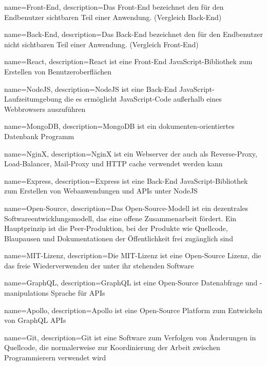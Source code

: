{   name={Front-End},
    description={Das Front-End bezeichnet den für den Endbenutzer sichtbaren Teil einer Anwendung. (Vergleich Back-End)}
}

{   name={Back-End},
    description={Das Back-End bezeichnet den für den Endbenutzer nicht sichtbaren Teil einer Anwendung. (Vergleich Front-End)}
}

{   name={React},
    description={React ist eine Front-End JavaScript-Bibliothek zum Erstellen von Benutzeroberflächen}
}

{   name={NodeJS},
    description={NodeJS ist eine Back-End JavaScript-Laufzeitumgebung die es ermöglicht JavaScript-Code außerhalb eines Webbrowsers auszuführen}
}

{   name={MongoDB},
    description={MongoDB ist ein dokumenten-orientiertes Datenbank Programm}
}

{   name={NginX},
    description={NginX ist ein Webserver der auch als Reverse-Proxy, Load-Balancer, Mail-Proxy und HTTP cache verwendet werden kann}
}

{   name={Express},
    description={Express ist eine Back-End JavaScript-Bibliothek zum Erstellen von Webanwendungen und APIs unter NodeJS}
}

{   name={Open-Source},
    description={Das Open-Source-Modell ist ein dezentrales Softwareentwicklungsmodell, das eine offene Zusammenarbeit fördert. Ein Hauptprinzip ist die Peer-Produktion, bei der Produkte wie Quellcode, Blaupausen und Dokumentationen der Öffentlichkeit frei zugänglich sind}
}

{   name={MIT-Lizenz},
    description={Die MIT-Lizenz ist eine Open-Source Lizenz, die das freie Wiederverwenden der unter ihr stehenden Software}
}

{   name={GraphQL},
    description={GraphQL ist eine Open-Source Datenabfrage und -manipulations Sprache für APIs}
}

{   name={Apollo},
    description={Apollo ist eine Open-Source Platform zum Entwickeln von GraphQL APIs}
}

{   name={Git},
    description={Git ist eine Software zum Verfolgen von Änderungen in Quellcode, die normalerweise zur Koordinierung der Arbeit zwischen Programmierern verwendet wird}
}

